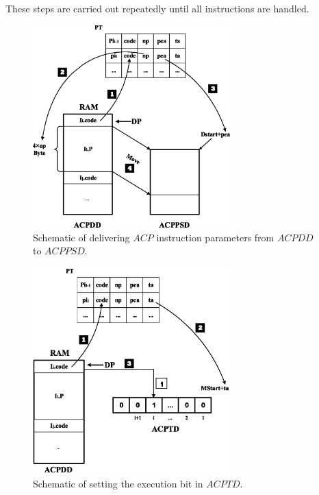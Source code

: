 \documentclass[journal]{IEEEtran}
\begin{document}
These steps are carried out repeatedly until all instructions are handled.
\begin{figure}
\centering
\includegraphics[width=3in]{fig/FIG9_TII-18-0024.eps}
\caption{Schematic of delivering $ACP$ instruction parameters from $ACPDD$ to $ACPPSD$.}
\label{fig:parametersfromACPDDtoACPSD}
\end{figure}



\begin{figure}
\centering
\includegraphics[width=3in]{fig/FIG10_TII-18-0024.eps}
\caption{ Schematic of setting the execution bit in $ACPTD$.}
\label{fig:settingexecutionbitinACPTD}
\end{figure}
\end{document}
